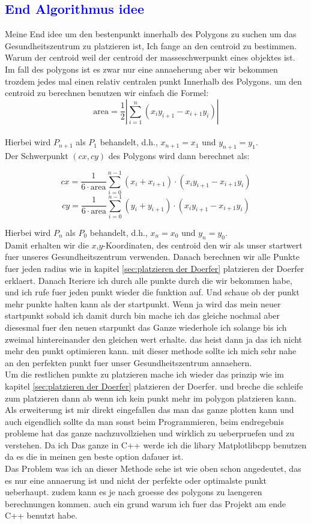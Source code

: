 \documentclass{article}
\begin{document}
\subsection{\textcolor{blue}{End Algorithmus idee}}
Meine End idee um den bestenpunkt innerhalb des Polygons zu suchen um das Gesundheitszentrum zu platzieren ist, Ich fange an den centroid zu bestimmen. Warum der centroid weil der centroid der masseschwerpunkt eines objektes ist. Im fall des polygons ist es zwar nur eine annaeherung aber wir bekommen trozdem jedes mal einen relativ centralen punkt Innerhalb des Polygons. um den centroid zu berechnen benutzen wir einfach die Formel:
\[
\text{area} = \frac{1}{2} \left| \sum_{i=1}^{n} (x_i y_{i+1} - x_{i+1} y_i) \right|
\]
\\
Hierbei wird $P_{n+1}$ als $P_1$ behandelt, d.h., $x_{n+1} = x_1$ und $y_{n+1} = y_1$.
\\
Der Schwerpunkt $(cx, cy)$ des Polygons wird dann berechnet als:

\[
cx = \frac{1}{6 \cdot \text{area}} \sum_{i=0}^{n-1} (x_i + x_{i+1}) \cdot (x_i y_{i+1} - x_{i+1} y_i)
\]
\[
cy = \frac{1}{6 \cdot \text{area}} \sum_{i=0}^{n-1} (y_i + y_{i+1}) \cdot (x_i y_{i+1} - x_{i+1} y_i)
\]

Hierbei wird $P_{n}$ als $P_0$ behandelt, d.h., $x_{n} = x_0$ und $y_{n} = y_0$.
\\
Damit erhalten wir die $x$,$y$-Koordinaten, des centroid den wir als unser startwert fuer unseres Gesundheitszentrum verwenden. Danach berechnen wir alle Punkte fuer jeden radius wie in kapitel \ref{sec:platzieren der Doerfer} platzieren der Doerfer erklaert. Danach Iteriere ich durch alle punkte durch die wir bekommen habe, und ich rufe fuer jeden punkt wieder die funktion auf. Und schaue ob der punkt mehr punkte halten kann als der startpunkt. Wenn ja wird das mein neuer startpunkt sobald ich damit durch bin mache ich das gleiche nochmal aber diesesmal fuer den neuen starpunkt das Ganze wiederhole ich solange bis ich zweimal hintereinander den gleichen wert erhalte. das heist dann ja das ich nicht mehr den punkt optimieren kann. mit dieser methode sollte ich mich sehr nahe an den perfekten punkt fuer unser Gesundheitszentrum annaehern.
\\
Um die restlichen punkte zu platzieren mache ich wieder das prinzip wie im kapitel \ref{sec:platzieren der Doerfer} platzieren der Doerfer. und breche die schleife zum platzieren dann ab wenn ich kein punkt mehr im polygon platzieren kann.
\\
Als erweiterung ist mir direkt eingefallen das man das ganze plotten kann und auch eigendlich sollte da man sonst beim Programmieren, beim endregebnis probleme hat das ganze nachzuvollziehen und wirklich zu ueberpruefen und zu verstehen. Da ich Das ganze in C++ werde ich die libary Matplotlibcpp benutzen da es die in meinen gen beste option dafauer ist.
\\
Das Problem was ich an dieser Methode sehe ist wie oben schon angedeutet, das es nur eine annaerung ist und nicht der perfekte oder optimalste punkt ueberhaupt. zudem kann es je nach groesse des polygons zu laengeren berechnungen kommen. auch ein grund warum ich fuer das Projekt am ende C++ benutzt habe.
\end{document}
